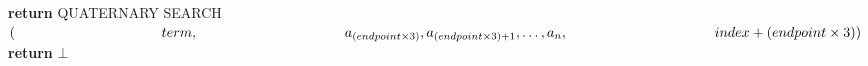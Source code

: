 \documentclass[a4paper, 12pt]{article}
\begin{document}
\begin{algorithm}
\begin{algorithmic}[1]
				\State \textbf{return} QUATERNARY SEARCH$(\newline \indent \indent \indent \indent \indent \indent \indent term,\newline \indent \indent \indent \indent \indent \indent \indent a_{(endpoint \times 3)}, a_{(endpoint \times 3)+1}, \dots, a_n,\newline \indent \indent \indent \indent \indent \indent \indent index+(endpoint \times 3))$
			\Else
				\State \textbf{return} $\bot$ 
			\EndIf
			\EndProcedure
			
		\end{algorithmic}

	\end{algorithm}
\end{document}
